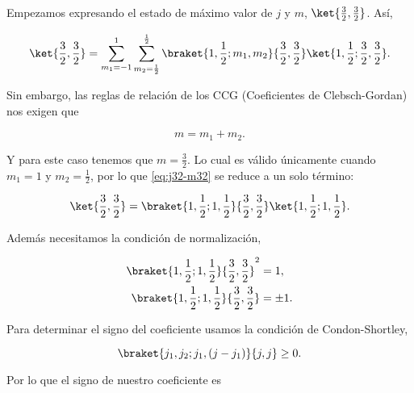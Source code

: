 \documentclass[./../main.tex]{subfiles}
\begin{document}
\begin{exercise}
\begin{enumerate}[label=(\alph*)]
\begin{solution}
                Empezamos expresando el estado de máximo valor de \(j\) y \(m\), \(\ket{\frac{3}{2},\frac{3}{2}}\). Así,

                \begin{equation}
                    \ket{\frac{3}{2}, \frac{3}{2}} = \sum_{m_{1} = -1}^{1}\sum_{m_{2} = \frac{1}{2}}^{\frac{1}{2}}\braket{1, \frac{1}{2}; m_{1}, m_{2}}{\frac{3}{2}, \frac{3}{2}}\ket{1, \frac{1}{2}; \frac{3}{2}, \frac{3}{2}}.
                    \label{eq:j32-m32}
                \end{equation}

                Sin embargo, las reglas de relación de los CCG (Coeficientes de Clebsch-Gordan) nos exigen que

                \begin{equation*}
                    m = m_{1} + m_{2}.
                \end{equation*}

                Y para este caso tenemos que \(m = \frac{3}{2}\). Lo cual es válido únicamente cuando \(m_{1} = 1\) y \(m_{2} = \frac{1}{2}\), por lo que \cref{eq:j32-m32} se reduce a un solo término:

                \begin{equation*}
                    \ket{\frac{3}{2}, \frac{3}{2}} = \braket{1, \frac{1}{2}; 1, \frac{1}{2}}{\frac{3}{2}, \frac{3}{2}}\ket{1, \frac{1}{2}; 1, \frac{1}{2}}.
                \end{equation*}

                Además necesitamos la condición de normalización,

                \begin{align*}
                    \braket{1, \frac{1}{2}; 1, \frac{1}{2}}{\frac{3}{2}, \frac{3}{2}}^{2} &= 1,\\
                    \braket{1, \frac{1}{2}; 1, \frac{1}{2}}{\frac{3}{2}, \frac{3}{2}} &= \pm 1.
                \end{align*}

                Para determinar el signo del coeficiente usamos la condición de Condon-Shortley,

                \begin{equation*}
                    \braket{j_{1}, j_{2}; j_{1}, (j - j_{1})}{j, j} \geq 0.
                \end{equation*}

                Por lo que el signo de nuestro coeficiente es


\end{solution}
\end{enumerate}
\end{exercise}
\end{document}

